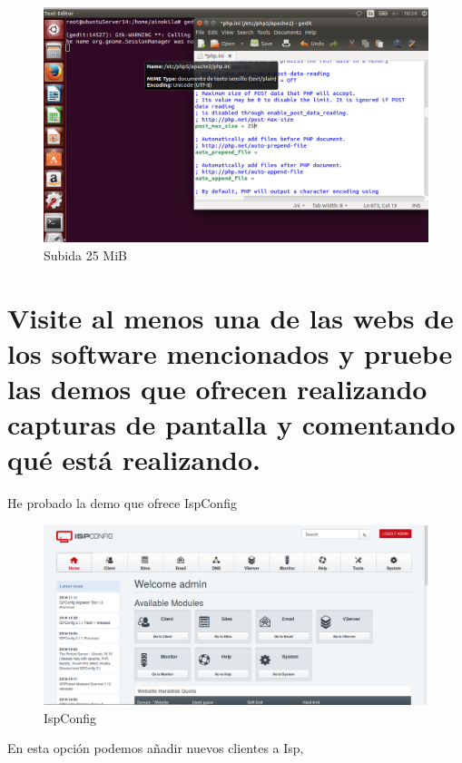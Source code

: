 	\begin{figure}[H]
	\centering
	\includegraphics[scale=0.35]{pics/cambio_php.png}
	\caption{Subida 25 MiB} \label{fig:php_cambio}
\end{figure}


\section[Cuestión 14]{Visite al menos una de las webs de los software mencionados	y pruebe las demos que ofrecen realizando capturas de pantalla y	comentando qué está realizando.}

He probado la demo que ofrece IspConfig\cite{isp}

	\begin{figure}[H]
	\centering
	\includegraphics[scale=0.35]{pics/ejemplo_1.png}  
	\caption{IspConfig} \label{fig:isp_config1}
	\end{figure}

En esta opción podemos añadir nuevos clientes a Isp,

